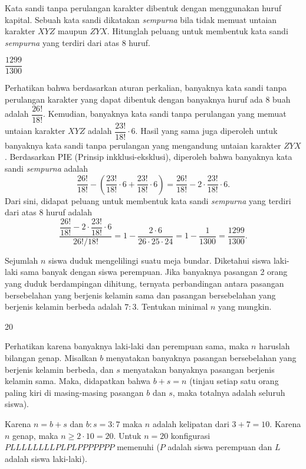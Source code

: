 \documentclass[11pt]{scrartcl}
\begin{document}
	\begin{soalbaru}
		Kata sandi tanpa perulangan karakter dibentuk dengan menggunakan huruf kapital. Sebuah kata sandi dikatakan \textit{sempurna} bila tidak memuat untaian karakter $XYZ$ maupun $ZYX$. Hitunglah peluang untuk membentuk kata sandi \textit{sempurna} yang terdiri dari atas 8 huruf.
		
		\begin{jawaban}
		$\dfrac{1299}{1300}$
		\end{jawaban}
		\begin{solusi}
		Perhatikan bahwa berdasarkan aturan perkalian, banyaknya kata sandi tanpa perulangan karakter yang dapat dibentuk dengan banyaknya huruf ada 8 buah adalah $\dfrac{26!}{18!}$. Kemudian, banyaknya kata sandi tanpa perulangan yang memuat untaian karakter $XYZ$ adalah $\dfrac{23!}{18!}\cdot 6$. Hasil yang sama juga diperoleh untuk banyaknya kata sandi tanpa perulangan yang mengandung untaian karakter $ZYX$. Berdasarkan PIE (Prinsip inkklusi-eksklusi), diperoleh bahwa banyaknya kata sandi \textit{sempurna} adalah $$\dfrac{26!}{18!}-\left( \dfrac{23!}{18!}\cdot 6 +  \dfrac{23!}{18!}\cdot 6 \right)=\dfrac{26!}{18!}-2 \cdot \dfrac{23!}{18!} \cdot 6.$$ Dari sini, didapat peluang untuk membentuk kata sandi \textit{sempurna} yang terdiri dari atas 8 huruf adalah $$\dfrac{\dfrac{26!}{18!}-2 \cdot \dfrac{23!}{18!} \cdot 6}{26!/18!}=1-\dfrac{2\cdot 6}{26 \cdot 25 \cdot 24}= 1 - \dfrac{1}{1300}=\dfrac{1299}{1300}.$$
		\end{solusi}
	\end{soalbaru}
	
	\begin{soalbaru}
			Sejumlah $n$ siswa duduk mengelilingi suatu meja bundar. Diketahui siswa laki-laki sama banyak dengan siswa perempuan. Jika banyaknya pasangan 2 orang yang duduk berdampingan
			dihitung, ternyata perbandingan antara pasangan bersebelahan yang berjenis kelamin sama dan
			pasangan bersebelahan yang berjenis kelamin berbeda adalah $7 : 3$. Tentukan minimal $n$ yang mungkin.
			
			\begin{jawaban}
					20
					\end{jawaban}
					\begin{solusi}Perhatikan karena banyaknya laki-laki dan perempuan sama, maka $n$ haruslah bilangan genap.
					Misalkan $b$ menyatakan banyaknya pasangan bersebelahan yang berjenis kelamin berbeda, dan $s$ menyatakan banyaknya pasangan berjenis kelamin sama. Maka, didapatkan bahwa $b+s=n$ (tinjau setiap satu orang paling kiri di masing-masing pasangan $b$ dan $s$, maka totalnya adalah seluruh siswa).
					
					Karena $n=b+s$ dan $b:s=3:7$ maka $n$ adalah kelipatan dari $3+7=10$. Karena $n$ genap, maka $n \ge 2 \cdot 10 = 20$. Untuk $n=20$ konfigurasi $PLLLLLLLLPLPLPPPPPPP$ memenuhi ($P$ adalah siswa perempuan dan $L$ adalah siswa laki-laki).
					\end{solusi}
		\end{soalbaru}
			
\end{document}

